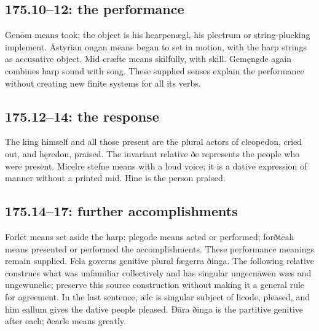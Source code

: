 \subsection*{175.10–12: the performance}

Genōm means took; the object is his hearpenægl, his plectrum or string-plucking implement. Āstyrian ongan means began to set in motion, with the harp strings as accusative object. Mid cræfte means skilfully, with skill. Gemęngde again combines harp sound with song. These supplied senses explain the performance without creating new finite systems for all its verbs.

\subsection*{175.12–14: the response}

The king himself and all those present are the plural actors of cleopedon, cried out, and hęredon, praised. The invariant relative ðe represents the people who were present. Micelre stefne means with a loud voice; it is a dative expression of manner without a printed mid. Hine is the person praised.

\subsection*{175.14–17: further accomplishments}

Forlēt means set aside the harp; plegode means acted or performed; forðtēah means presented or performed the accomplishments. These performance meanings remain supplied. Fela governs genitive plural fægerra ðinga. The following relative construes what was unfamiliar collectively and has singular ungecnāwen wæs and ungewunelic; preserve this source construction without making it a general rule for agreement. In the last sentence, ǣlc is singular subject of līcode, pleased, and him eallum gives the dative people pleased. Ðāra ðinga is the partitive genitive after each; ðearle means greatly.

